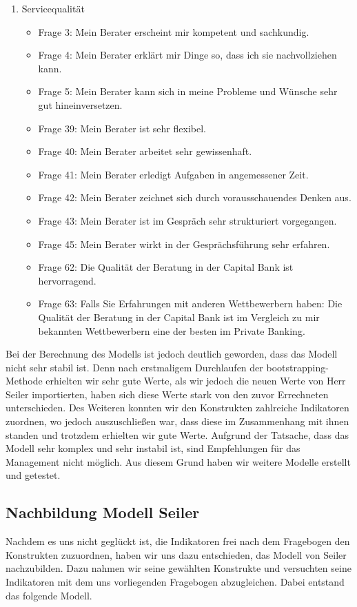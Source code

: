 \documentclass{article}\usepackage[]{graphicx}\usepackage[]{color}
\begin{document}
\begin{enumerate}
		
	\item Servicequalität
		\begin{itemize}
			\item Frage 3:
			Mein Berater erscheint mir kompetent und sachkundig.
			\item Frage 4:
			Mein Berater erklärt mir Dinge so, dass ich sie nachvollziehen kann.
			\item Frage 5:
			Mein Berater kann sich in meine Probleme und Wünsche sehr gut hineinversetzen.
			\item Frage 39:
			Mein Berater ist sehr flexibel.
			\item Frage 40:
			Mein Berater arbeitet sehr gewissenhaft.
			\item Frage 41:
			Mein Berater erledigt Aufgaben in angemessener Zeit.
			\item Frage 42:
			Mein Berater zeichnet sich durch vorausschauendes Denken aus.
			\item Frage 43:
			Mein Berater ist im Gespräch sehr strukturiert vorgegangen.
			\item Frage 45:
			Mein Berater wirkt in der Gesprächsführung sehr erfahren.
			\item Frage 62:
			Die Qualität der Beratung in der Capital Bank ist hervorragend.
			\item Frage 63:
			Falls Sie Erfahrungen mit anderen Wettbewerbern haben: Die Qualität der Beratung in der Capital Bank ist im Vergleich zu mir bekannten Wettbewerbern eine der besten im Private Banking.
		\end{itemize}
		
\end{enumerate}	


Bei der Berechnung des Modells ist jedoch deutlich geworden, dass das Modell nicht sehr stabil ist. Denn nach erstmaligem Durchlaufen der bootstrapping- Methode erhielten wir sehr gute Werte, als wir jedoch die neuen Werte von Herr Seiler importierten, haben sich diese Werte stark von den zuvor Errechneten unterschieden. Des Weiteren konnten wir den Konstrukten zahlreiche Indikatoren zuordnen, wo jedoch auszuschließen war, dass diese im Zusammenhang mit ihnen standen und trotzdem erhielten wir gute Werte. Aufgrund der Tatsache, dass das Modell sehr komplex und sehr instabil ist, sind Empfehlungen für das Management nicht möglich. Aus diesem Grund haben wir weitere Modelle erstellt und getestet. 

\subsection{Nachbildung Modell Seiler}
Nachdem es uns nicht geglückt ist, die Indikatoren frei nach dem Fragebogen den Konstrukten zuzuordnen, haben wir uns dazu entschieden, das Modell von Seiler nachzubilden. Dazu nahmen wir seine gewählten Konstrukte und versuchten seine Indikatoren mit dem uns vorliegenden Fragebogen abzugleichen. Dabei entstand das folgende Modell.
\end{document}

